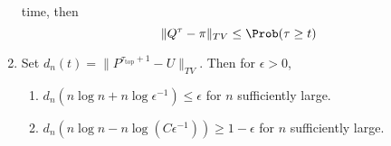 \documentclass[12pt]{article}
\begin{document}
\begin{enumerate}
        time, then
        \[
            \| Q^{\tau} - \pi \|_{TV} \le \Prob(\tau \ge t)
        \]
    \item
        Set \( d_n(t) = \| P^{\tau_{\text{top}}+1} - U \|_{TV} \).  Then
        for \( \epsilon > 0 \),
        \begin{enumerate}
            \item
                \( d_{n}(n \log n + n \log \epsilon^{-1} )\le \epsilon \)
                for \( n \) sufficiently large.
            \item
                \( d_{n}(n \log n - n \log (C \epsilon^{-1})) \ge 1-\epsilon
                \) for \( n \) sufficiently large.
        \end{enumerate}
\end{enumerate}

\hr

\end{document}
